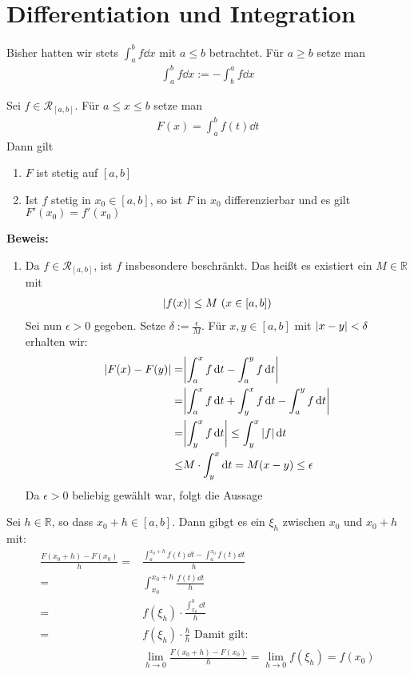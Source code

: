 
\section{Differentiation und Integration}

\begin{Bemerkung}{
	Bisher hatten wir stets $\int_a^b f \dd{x}$ mit $ a \leq b$ betrachtet.
	Für $a \geq b$ setze man 
	\begin{align*}
		\int_a^b f \dd{x} := - \int_b^a f \dd{x}
	\end{align*}
}\end{Bemerkung}

\begin{Satz}{
	Sei $f \in \mathcal{R}_{[a,b]}$. Für $ a \leq x \leq b$ setze man 
	\begin{align*}
		F(x) = \int_a^b f(t) \dd{t}
	\end{align*}
	Dann gilt
	\begin{enumerate}
		\item $F$ ist stetig auf $[a,b]$
		\item Ist $f$ stetig in $x_0 \in [a,b]$, so ist $F$ in $x_0$ differenzierbar 
		und es gilt $F'(x_0) = f'(x_0)$
	\end{enumerate}
	\textbf{Beweis:}
	\begin{enumerate}
		\item Da $f \in \mathcal{R}_{[a,b]}$, ist $f$ insbesondere beschränkt.
		Das heißt es existiert ein $M \in \mathbb{R}$ mit 
		\begin{align*}
			\abs{f(x)} \leq M \text{ } (x \in [a,b])
		\end{align*}
		Sei nun $\epsilon > 0$ gegeben. Setze $\delta := \frac{\epsilon}{M}$. 
		Für $x, y \in [a,b]$ mit $\abs{x-y} < \delta$ erhalten wir:
		\begin{align*}
			\abs{F(x) - F(y)} = & \abs{\int_a^x f \dd{t} - \int_a^y f \dd{t} }\\
			= &  \abs{\int_a^x f\dd{t} + \int_y^x f\dd{t} - \int_a^yf\dd{t}}\\
			= & \abs{\int_y^x f\dd{t}} \leq \int_y^x \abs{f} \dd{t}\\
			\leq & M \cdot \int_y^x \dd{t} = M (x-y) \leq \epsilon
		\end{align*}
		Da $\epsilon > 0$ beliebig gewählt war, folgt die Aussage
	\end{enumerate}
	\item Sei $h \in \mathbb{R}$, so dass $x_0 +h \in [a,b]$.
	Dann gibgt es ein $\xi_h$ zwischen $x_0$ und $x_0+h$ mit:
	\begin{align*}
		\frac{F(x_0 + h) - F(x_0)}{h} = & \frac{\int_a^{x_0+h}f(t)\dd{t}-
		\int_a^{x_0}f(t)\dd{t}}{	h} \\
		= & \int_{x_0}^{x_0+h}\frac{f(t)\dd{t}}{h} \\
		= & f(\xi_h) \cdot \frac{\int_{x_0}^h \dd{t}}{h} \\
		= & f(\xi_h) \cdot \frac{h}{h} \text{ Damit gilt:} \\
		&\lim\limits_{h \rightarrow 0}{\frac{F(x_0+h)-F(x_0)}{h}} 
		= \lim\limits_{h \rightarrow 0} f(\xi_h) = f(x_0)
	\end{align*}
}\end{Satz}


